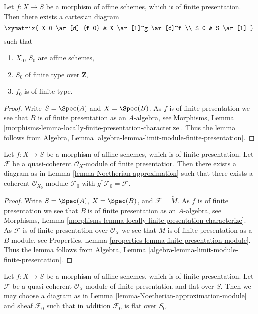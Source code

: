 \begin{lemma}
\label{lemma-Noetherian-approximation}
Let $f : X \to S$ be a morphism of affine schemes, which is of finite
presentation. Then there exists a cartesian diagram
$$
\xymatrix{
X_0 \ar[d]_{f_0} & X \ar[l]^g \ar[d]^f \\
S_0 & S \ar[l]
}
$$
such that
\begin{enumerate}
\item $X_0$, $S_0$ are affine schemes,
\item $S_0$ of finite type over $\mathbf{Z}$,
\item $f_0$ is of finite type.
\end{enumerate}
\end{lemma}

\begin{proof}
Write $S = \Spec(A)$ and $X = \Spec(B)$.
As $f$ is of finite presentation we see that
$B$ is of finite presentation as an $A$-algebra, see
Morphisms,
Lemma \ref{morphisms-lemma-locally-finite-presentation-characterize}.
Thus the lemma follows from
Algebra, Lemma \ref{algebra-lemma-limit-module-finite-presentation}.
\end{proof}

\begin{lemma}
\label{lemma-Noetherian-approximation-module}
Let $f : X \to S$ be a morphism of affine schemes, which is of finite
presentation. Let $\mathcal{F}$ be a quasi-coherent $\mathcal{O}_X$-module
of finite presentation. Then there exists a diagram as in
Lemma \ref{lemma-Noetherian-approximation}
such that there exists a coherent $\mathcal{O}_{X_0}$-module $\mathcal{F}_0$
with $g^*\mathcal{F}_0 = \mathcal{F}$.
\end{lemma}

\begin{proof}
Write $S = \Spec(A)$, $X = \Spec(B)$, and
$\mathcal{F} = \widetilde{M}$. As $f$ is of finite presentation we see that
$B$ is of finite presentation as an $A$-algebra, see
Morphisms,
Lemma \ref{morphisms-lemma-locally-finite-presentation-characterize}.
As $\mathcal{F}$ is of finite presentation over $\mathcal{O}_X$ we see that
$M$ is of finite presentation as a $B$-module, see
Properties, Lemma \ref{properties-lemma-finite-presentation-module}.
Thus the lemma follows from
Algebra, Lemma \ref{algebra-lemma-limit-module-finite-presentation}.
\end{proof}

\begin{lemma}
\label{lemma-Noetherian-approximation-flat-module}
Let $f : X \to S$ be a morphism of affine schemes, which is of finite
presentation. Let $\mathcal{F}$ be a quasi-coherent $\mathcal{O}_X$-module
of finite presentation and flat over $S$. Then we may choose a diagram as in
Lemma \ref{lemma-Noetherian-approximation-module}
and sheaf $\mathcal{F}_0$ such that in addition $\mathcal{F}_0$
is flat over $S_0$.
\end{lemma}

